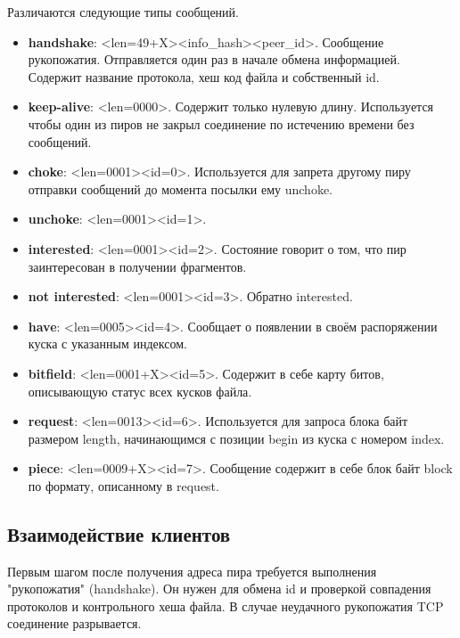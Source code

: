 Различаются следующие типы сообщений.
\begin{itemize}
	\item \textbf{handshake}: <len=49+X><info\_hash><peer\_id>. Сообщение рукопожатия. Отправляется один раз в начале обмена информацией. Содержит название протокола, хеш код файла и собственный id.
	
	\item \textbf{keep-alive}: <len=0000>. Содержит только нулевую длину. Используется чтобы один из пиров не закрыл соединение по истечению времени без сообщений.
	
	\item \textbf{choke}: <len=0001><id=0>. Используется для запрета другому пиру отправки сообщений до момента посылки ему unchoke.
	
	\item \textbf{unchoke}: <len=0001><id=1>.

	\item \textbf{interested}: <len=0001><id=2>. Состояние говорит о том, что пир заинтересован в получении фрагментов.
	
	\item \textbf{not interested}: <len=0001><id=3>. Обратно interested.
	
	\item \textbf{have}: <len=0005><id=4>. Сообщает о появлении в своём распоряжении куска с указанным индексом.
	
	\item \textbf{bitfield}: <len=0001+X><id=5>. Содержит в себе карту битов, описывающую статус всех кусков файла.
	
	\item \textbf{request}: <len=0013><id=6>. Используется для запроса блока байт размером length, начинающимся с позиции begin из куска с номером index.
	
	\item \textbf{piece}: <len=0009+X><id=7>. Сообщение содержит в себе блок байт block по формату, описанному в request. \newline
\end{itemize}

\subsection{Взаимодействие клиентов}
Первым шагом после получения адреса пира требуется выполнения "рукопожатия" (handshake). Он нужен для обмена id и проверкой совпадения протоколов и контрольного хеша файла. В случае неудачного рукопожатия TCP соединение разрывается.

